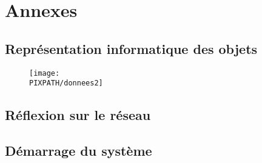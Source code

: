 \section{Annexes}
\subsection{Représentation informatique des objets}
    \begin{figure}[!h]
    \begin{center}
    \texttt{[image: \\PIXPATH/donnees2]}
    \caption{}
    \end{center}
    \end{figure}
\subsection{Réflexion sur le réseau}
\subsection{Démarrage du système}
